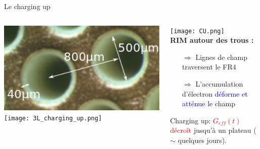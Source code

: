     \begin{frame}{Le charging up}
        \begin{scriptsize}
            \begin{columns}
      			\begin{column}{0.5\textwidth}
          			\includegraphics[width=\textwidth]{RIM.png}\\\vspace{1cm}
      				\texttt{[image: 3L\_charging\_up.png]}\\
      			\end{column}\hfill
      			\begin{column}{0.5\textwidth}
      				\texttt{[image: CU.png]}\\\vspace{1cm}
          			\textbf{RIM autour des trous :}
      				\begin{itemize}
      					\item[$\Rightarrow$] Lignes de champ traversent le FR4\\
      					\item[$\Rightarrow$] L'accumulation d'électron \textcolor{blue}{déforme et atténue} le champ
      				\end{itemize}
      				Charging up: \textcolor{red}{$G_{eff}(t)$ décroît} jusqu'à un plateau ($\sim$ quelques jours).
      			\end{column}
      		\end{columns}
        \end{scriptsize}
    \end{frame}

